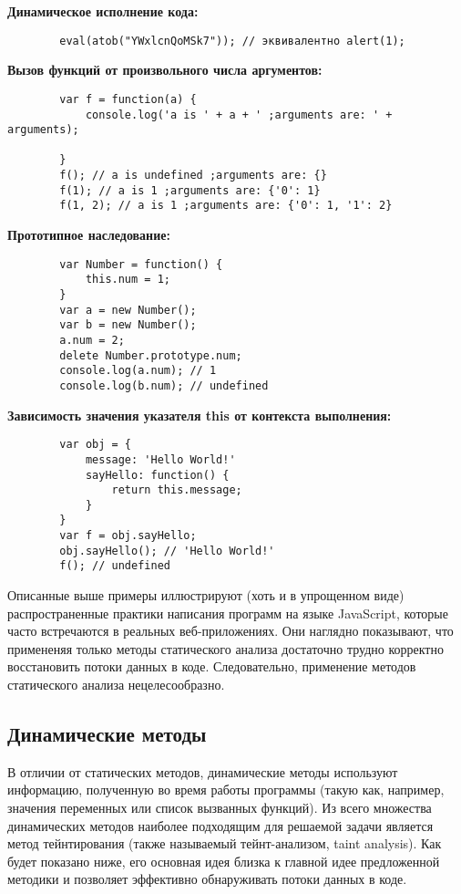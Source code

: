 	\bigskip
	\textbf{Динамическое исполнение кода:}
	\begin{lstlisting}
		eval(atob("YWxlcnQoMSk7")); // эквивалентно alert(1);
	\end{lstlisting}

	\bigskip
	\textbf{Вызов функций от произвольного числа аргументов:}
	\begin{lstlisting}
		var f = function(a) {
			console.log('a is ' + a + ' ;arguments are: ' + arguments);
			
		}
		f(); // a is undefined ;arguments are: {}
		f(1); // a is 1 ;arguments are: {'0': 1}
		f(1, 2); // a is 1 ;arguments are: {'0': 1, '1': 2}
	\end{lstlisting}		

	\bigskip
	\textbf{Прототипное наследование:}
	\begin{lstlisting}
		var Number = function() {
			this.num = 1;
		}
		var a = new Number();
		var b = new Number();
		a.num = 2;
		delete Number.prototype.num;
		console.log(a.num); // 1
		console.log(b.num); // undefined
	\end{lstlisting}	

	\bigskip
	\textbf{Зависимость значения указателя this от контекста выполнения:}
	\begin{lstlisting}
		var obj = {
			message: 'Hello World!'
			sayHello: function() {
				return this.message;
			}
		}
		var f = obj.sayHello;
		obj.sayHello(); // 'Hello World!'
		f(); // undefined
	\end{lstlisting}	


	Описанные выше примеры иллюстрируют (хоть и в упрощенном виде) распространенные практики написания программ на языке JavaScript, которые часто встречаются в реальных веб-приложениях. Они наглядно показывают, что примененяя только методы статического анализа достаточно трудно корректно восстановить потоки данных в коде. Следовательно, применение методов статического анализа нецелесообразно.

\subsection{Динамические методы}
	В отличии от статических методов, динамические методы используют информацию, полученную во время работы программы (такую как, например, значения переменных или список вызванных функций). Из всего множества динамических методов наиболее подходящим для решаемой задачи является метод тейнтирования (также называемый тейнт-анализом, taint analysis). Как будет показано ниже, его основная идея близка к главной идее предложенной методики и позволяет эффективно обнаруживать потоки данных в коде.



